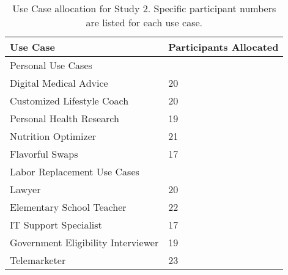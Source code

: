 \begin{table}[!hbpt]
    \centering
    \small
    \begin{tabularx}{0.4\linewidth}{l|X}
    \toprule
       Use Case & Participants Allocated \\
    \midrule
       Personal Use Cases & \\
    \midrule
       Digital Medical Advice & 20 \\
       Customized Lifestyle Coach & 20 \\
       Personal Health Research & 19 \\
       Nutrition Optimizer & 21 \\
       Flavorful Swaps & 17 \\
    \midrule
       Labor Replacement Use Cases & \\
    \midrule
       Lawyer & 20 \\
       Elementary School Teacher & 22 \\
       IT Support Specialist & 17 \\
       Government Eligibility Interviewer & 19 \\
       Telemarketer & 23 \\
    \bottomrule
    \end{tabularx}
    \caption{Use Case allocation for Study 2. Specific participant numbers are listed for each use case.}
    \label{tab:study2-use-case}
\end{table}